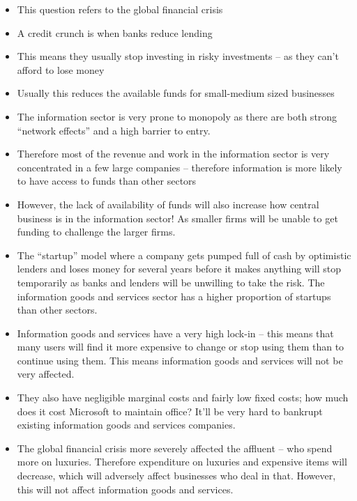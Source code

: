 \documentclass[10pt, a4paper]{article}
\begin{document}
\begin{itemize}

\item This question refers to the global financial crisis

\item A credit crunch is when banks reduce lending

\item This means they usually stop investing in risky investments -- as they
can't afford to lose money

\item Usually this reduces the available funds for small-medium sized
businesses

\item The information sector is very prone to monopoly as there are both
strong ``network effects'' and a high barrier to entry.

\item Therefore most of the revenue and work in the information sector is
very concentrated in a few large companies -- therefore information is more
likely to have access to funds than other sectors

\item However, the lack of availability of funds will also increase how
central business is in the information sector! As smaller firms will be
unable to get funding to challenge the larger firms.

\item The ``startup'' model where a company gets pumped full of cash by
optimistic lenders and loses money for several years before it makes
anything will stop temporarily as banks and lenders will be unwilling to
take the risk. The information goods and services sector has a higher
proportion of startups than other sectors.

\item Information goods and services have a very high lock-in -- this means
that many users will find it more expensive to change or stop using them
than to continue using them. This means information goods and services will
not be very affected.

\item They also have negligible marginal costs and fairly low fixed costs;
how much does it cost Microsoft to maintain office? It'll be very hard to
bankrupt existing information goods and services companies.

\item The global financial crisis more severely affected the affluent -- who
spend more on luxuries. Therefore expenditure on luxuries and expensive
items will decrease, which will adversely affect businesses who deal in that.
However, this will not affect information goods and services.


\end{itemize}
\end{document}
